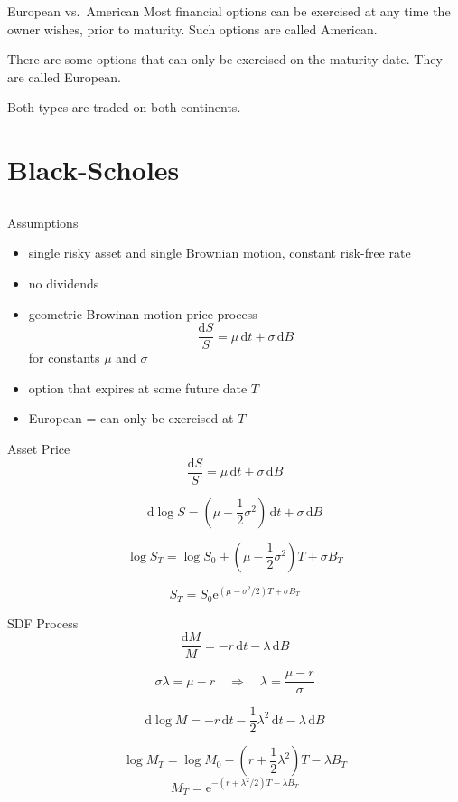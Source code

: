 \documentclass[10pt]{beamer}
\newcommand{\bi}{\begin{itemize}}
\newcommand{\ei}{\end{itemize}}
\newcommand{\im}{\item}
\newcommand{\D}{\mathrm{d}}
\newcommand{\E}{\mathrm{e}}
\begin{document}
\begin{frame}{European vs.\ American}
    Most financial options can be exercised at any time the owner wishes, prior to maturity.  Such options are called American.
    
    There are some options that can only be exercised on the maturity date.  They are called European.
    
    Both types are traded on both continents.
\end{frame}


\section{Black-Scholes}\subsection{}
\begin{frame}{Assumptions}
    \bi 
    \im single risky asset and single Brownian motion, constant risk-free rate
    
    \im no dividends
    
    \im geometric Browinan motion price process
    $$\frac{\D S}{S} = \mu\,\D t + \sigma\,\D B$$
    for constants $\mu$ and $\sigma$
    
    \im option that expires at some future date $T$
    
    \im European = can only be exercised at $T$ 
    \ei
\end{frame}

\begin{frame}{Asset Price}
  $$\frac{\D S}{S} = \mu\,\D t + \sigma\,\D B$$
  \pause
  
  $$\D \log S = \left(\mu - \frac{1}{2}\sigma^2\right)\,\D t + \sigma\,\D B$$
  \pause
  
  $$\log S_T = \log S_0 + \left(\mu - \frac{1}{2}\sigma^2\right)T + \sigma B_T$$
  
  $$S_T = S_0 \E^{(\mu-\sigma^2/2)T + \sigma B_T}$$
  
  
\end{frame}
\begin{frame}{SDF Process}
$$\frac{\D M}{M} = - r\,\D t - \lambda\,\D B$$

$$\sigma\lambda = \mu-r \quad \Rightarrow \quad \lambda = \frac{\mu-r}{\sigma}$$

\pause
$$\D \log M = -r\,\D t - \frac{1}{2}\lambda^2\,\D t - \lambda\,\D B$$

\pause
$$\log M_T = \log M_0 -\left(r + \frac{1}{2}\lambda^2\right)T - \lambda B_T$$
\pause
$$M_T = \E^{-(r+\lambda^2/2)T - \lambda B_T}$$
\end{frame}
\end{document}
